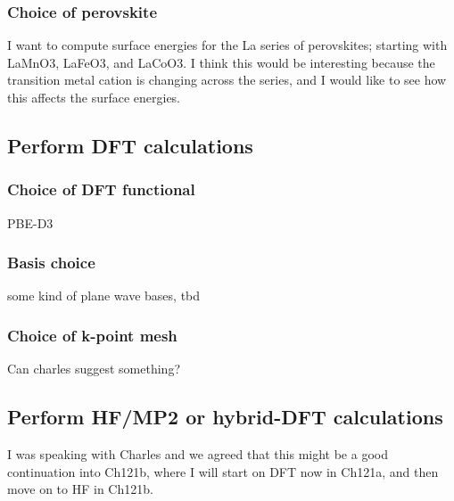 \documentclass[12pt]{article}
\begin{document}
\subsubsection{Choice of perovskite}
I want to compute surface energies for the La series of perovskites; starting with LaMnO3, LaFeO3, and LaCoO3. I think this would be interesting because the transition metal cation is changing across the series, and I would like to see how this affects the surface energies.
\subsection{Perform DFT calculations}
\subsubsection{Choice of DFT functional}
PBE-D3
\subsubsection{Basis choice}
some kind of plane wave bases, tbd
\subsubsection{Choice of k-point mesh}
Can charles suggest something?
\subsection{Perform HF/MP2 or hybrid-DFT calculations}
I was speaking with Charles and we agreed that this might be a good continuation into Ch121b, where I will start on DFT now in Ch121a, and then move on to HF in Ch121b.


\end{document}
